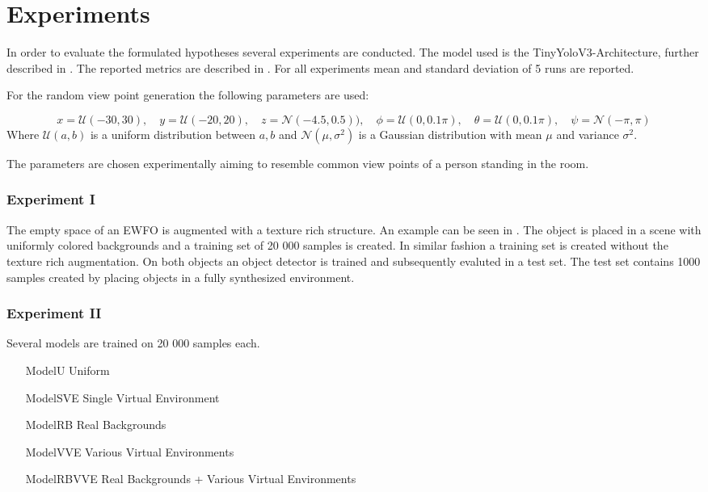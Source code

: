 \section{Experiments}
\label{sec:training:experiments}
In order to evaluate the formulated hypotheses several experiments are conducted. The model used is the TinyYoloV3-Architecture, further described in . The reported metrics are described in . For all experiments mean and standard deviation of 5 runs are reported.

For the random view point generation the following parameters are used:

\begin{equation}
	x = \mathcal{U}(-30,30),\quad y = \mathcal{U}(-20,20),\quad z = \mathcal{N}(-4.5,0.5)),\quad
	\phi = \mathcal{U}(0,0.1\pi),\quad \theta = \mathcal{U}(0,0.1\pi),\quad \psi = \mathcal{N}(-\pi,\pi)
	\label{eq:distroexp}
\end{equation}
Where $ \mathcal{U}(a,b)$ is a uniform distribution between $a,b$ and $\mathcal{N}(\mu,\sigma^2)$ is a Gaussian distribution with mean $\mu$ and variance $\sigma^2$.

The parameters are chosen experimentally aiming to resemble common view points of a person standing in the room.

\subsubsection{Experiment I}
The empty space of an \ac{EWFO} is augmented with a texture rich structure. An example can be seen in . The object is placed in a scene with uniformly colored backgrounds and a training set of 20 000 samples is created. In similar fashion a training set is created without the texture rich augmentation. On both objects an object detector is trained and subsequently evaluted in a test set. The test set contains 1000 samples created by placing objects in a fully synthesized environment.

\subsubsection{Experiment II}

Several models are trained on 20 000 samples each.
\begin{itemize}
	\item[ModelU] Uniform
	\item[ModelSVE] Single Virtual Environment
	\item[ModelRB] Real Backgrounds
	\item[ModelVVE] Various Virtual Environments
	\item[ModelRBVVE] Real Backgrounds + Various Virtual Environments
\end{itemize}

